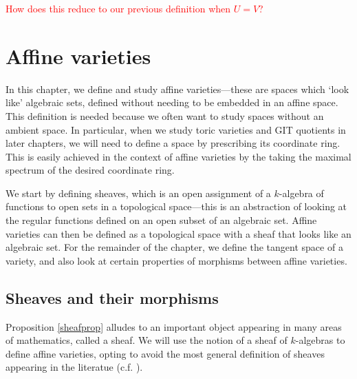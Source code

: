 \documentclass[12pt]{amsart}
\theoremstyle{plain}
\begin{document}
\textcolor{red}{How does this reduce to our previous definition when $U=V$?}

\newpage
\section{Affine varieties}
In this chapter, we define and study affine varieties---these are spaces which `look like' algebraic sets, defined without needing to be embedded in an affine space.
This definition is needed because we often want to study spaces without an ambient space.
In particular, when we study toric varieties and GIT quotients in later chapters, we will need to define a space by prescribing its coordinate ring.
This is easily achieved in the context of affine varieties by the taking the maximal spectrum of the desired coordinate ring.

We start by defining sheaves, which is an open assignment of a $k$-algebra of functions to open sets in a topological space---this is an abstraction of looking at the regular functions defined on an open subset of an algebraic set.
Affine varieties can then be defined as a topological space with a sheaf that looks like an algebraic set.
For the remainder of the chapter, we define the tangent space of a variety, and also look at certain properties of morphisms between affine varieties.

\subsection{Sheaves and their morphisms}\label{varietiessection}
Proposition \ref{sheafprop} alludes to an important object appearing in many areas of mathematics, called a sheaf.
We will use the notion of a sheaf of $k$-algebras to define affine varieties, opting to avoid the most general definition of sheaves appearing in the literatue (c.f. {\cite[Chapter II, \S 1]{Hartshorne77}}).
\end{document}

